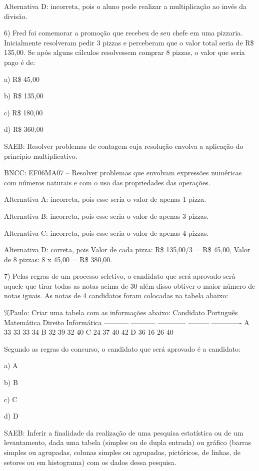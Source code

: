 Alternativa D: incorreta, pois o aluno pode realizar a multiplicação ao
invés da divisão.

6) Fred foi comemorar a promoção que recebeu de seu chefe em uma
pizzaria. Inicialmente resolveram pedir 3 pizzas e perceberam que o
valor total seria de R\$ 135,00. Se após alguns cálculos resolvessem
comprar 8 pizzas, o valor que seria pago é de:

a) R\$ 45,00

b) R\$ 135,00

c) R\$ 180,00

d) R\$ 360,00

SAEB: Resolver problemas de contagem cuja resolução envolva a aplicação
do princípio multiplicativo.

BNCC: EF06MA07 -- Resolver problemas que envolvam expressões numéricas
com números naturais e com o uso das propriedades das operações.

Alternativa A: incorreta, pois esse seria o valor de apenas 1 pizza.

Alternativa B: incorreta, pois esse seria o valor de apenas 3 pizzas.

Alternativa C: incorreta, pois esse seria o valor de apenas 4 pizzas.

Alternativa D: correta, pois Valor de cada pizza: R\$ 135,00/3 = R\$
45,00, Valor de 8 pizzas: 8 x 45,00 = R\$ 380,00.

7) Pelas regras de um processo seletivo, o candidato que será aprovado
será aquele que tirar todas as notas acima de 30 além disso obtiver o
maior número de notas iguais. As notas de 4 candidatos foram colocadas
na tabela abaixo:

\%Paulo: Criar uma tabela com as informações abaixo: Candidato Português
Matemática Direito Informática ----------- ----------- ------------
--------- ------------- A 33 33 33 34 B 32 39 32 40 C 24 37 40 42 D 36
16 26 40

Segundo as regras do concurso, o candidato que será aprovado é a
candidato:

a) A

b) B

c) C

d) D

SAEB: Inferir a finalidade da realização de uma pesquisa estatística ou
de um levantamento, dada uma tabela (simples ou de dupla entrada) ou
gráfico (barras simples ou agrupadas, colunas simples ou agrupadas,
pictóricos, de linhas, de setores ou em histograma) com os dados dessa
pesquisa.


